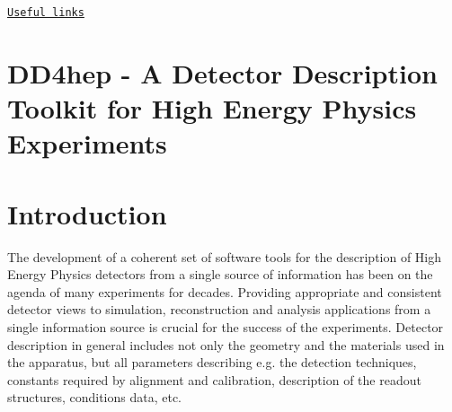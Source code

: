 \href{#UsefulLinks}{\tt Useful links}\hypertarget{index_MAIN}{}\section{D\+D4hep -\/ A Detector Description Toolkit for High Energy Physics Experiments}\label{index_MAIN}
\hypertarget{index_INTRO}{}\section{Introduction}\label{index_INTRO}
The development of a coherent set of software tools for the description of High Energy Physics detectors from a single source of information has been on the agenda of many experiments for decades. Providing appropriate and consistent detector views to simulation, reconstruction and analysis applications from a single information source is crucial for the success of the experiments. Detector description in general includes not only the geometry and the materials used in the apparatus, but all parameters describing e.\+g. the detection techniques, constants required by alignment and calibration, description of the readout structures, conditions data, etc.

